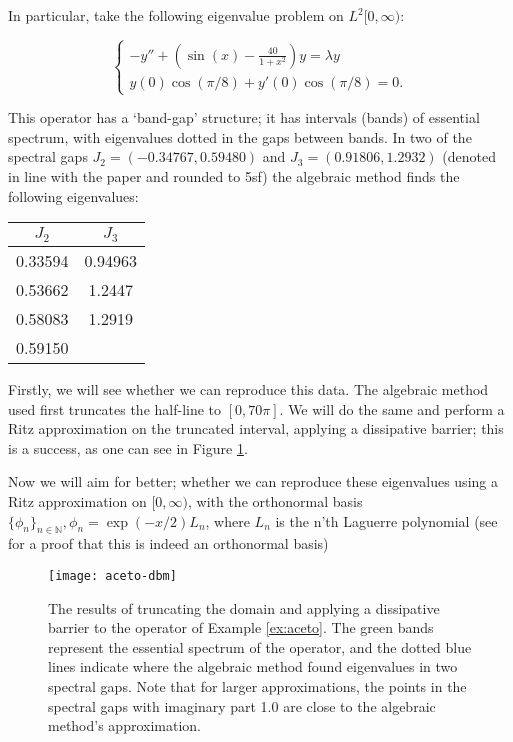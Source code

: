 \documentclass[../main.tex]{subfiles}
\begin{document}
\begin{example}\label{ex:aceto}
In particular, take the following eigenvalue problem on $L^2[0, \infty)$:

$$
\begin{cases}
-y'' + (\sin(x) - \frac{40}{1+x^2})y = \lambda y \\
y(0) \cos(\pi/8) + y'(0) \cos(\pi/8) = 0.
\end{cases}
$$

This operator has a `band-gap' structure; it has intervals (bands) of essential spectrum, with eigenvalues dotted in the gaps between bands.
In two of the spectral gaps $J_2 = (-0.34767, 0.59480)$ and $J_3 = (0.91806, 1.2932)$ (denoted in line with the paper and rounded to 5sf) the
algebraic method finds the following eigenvalues:

\begin{figure*}[h!]
\centering
\begin{tabular}{c c}
$J_2$ & $J_3$ \\
\hline\hline
0.33594 & 0.94963 \\
0.53662 & 1.2447 \\
0.58083 & 1.2919 \\
0.59150 & \\
\end{tabular}
\end{figure*}

Firstly, we will see whether we can reproduce this data. The algebraic method used first truncates the half-line to $[0, 70\pi]$. We will do the same and
perform a Ritz approximation on the truncated interval, applying a dissipative barrier; this is a success, as one can see in Figure \ref{fig:aceto-dbm}.

Now we will aim for better; whether we can reproduce these eigenvalues using a Ritz approximation on $[0, \infty)$, with the orthonormal basis $\{\phi_n\}_{n \in \mathbb{N}},
\phi_n = \exp(-x/2)L_n$, where $L_n$ is the n'th Laguerre polynomial (see \cite{szego1975orthogonal} for a proof that this is indeed an orthonormal basis)
\end{example}

\begin{figure}[p!] %
\texttt{[image: aceto-dbm]}
\caption{The results of truncating the domain and applying a dissipative barrier to the operator of Example \ref{ex:aceto}.
The green bands represent the essential spectrum of the operator, and the dotted blue lines indicate where the algebraic method found
eigenvalues in two spectral gaps. Note that for larger approximations, the points in the spectral gaps with imaginary part 1.0 are close to the algebraic method's approximation.}
\label{fig:aceto-dbm}
\end{figure}
\clearpage
\end{document}
